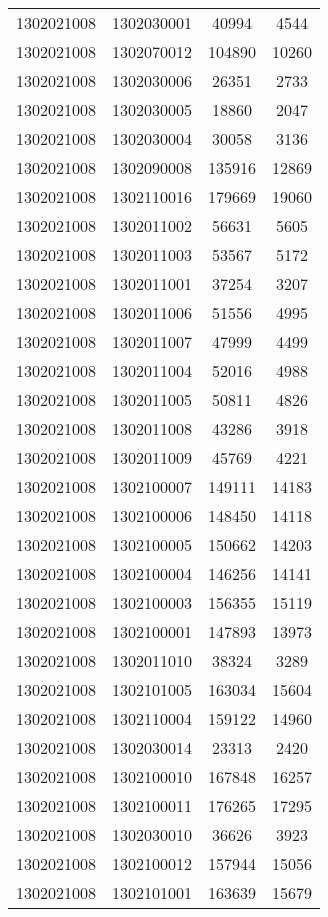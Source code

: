 \begin{longtable}[h]{llcc}
		1302021008 & 1302030001 & 40994 & 4544\\
		1302021008 & 1302070012 & 104890 & 10260\\
		1302021008 & 1302030006 & 26351 & 2733\\
		1302021008 & 1302030005 & 18860 & 2047\\
		1302021008 & 1302030004 & 30058 & 3136\\
		1302021008 & 1302090008 & 135916 & 12869\\
		1302021008 & 1302110016 & 179669 & 19060\\
		1302021008 & 1302011002 & 56631 & 5605\\
		1302021008 & 1302011003 & 53567 & 5172\\
		1302021008 & 1302011001 & 37254 & 3207\\
		1302021008 & 1302011006 & 51556 & 4995\\
		1302021008 & 1302011007 & 47999 & 4499\\
		1302021008 & 1302011004 & 52016 & 4988\\
		1302021008 & 1302011005 & 50811 & 4826\\
		1302021008 & 1302011008 & 43286 & 3918\\
		1302021008 & 1302011009 & 45769 & 4221\\
		1302021008 & 1302100007 & 149111 & 14183\\
		1302021008 & 1302100006 & 148450 & 14118\\
		1302021008 & 1302100005 & 150662 & 14203\\
		1302021008 & 1302100004 & 146256 & 14141\\
		1302021008 & 1302100003 & 156355 & 15119\\
		1302021008 & 1302100001 & 147893 & 13973\\
		1302021008 & 1302011010 & 38324 & 3289\\
		1302021008 & 1302101005 & 163034 & 15604\\
		1302021008 & 1302110004 & 159122 & 14960\\
		1302021008 & 1302030014 & 23313 & 2420\\
		1302021008 & 1302100010 & 167848 & 16257\\
		1302021008 & 1302100011 & 176265 & 17295\\
		1302021008 & 1302030010 & 36626 & 3923\\
		1302021008 & 1302100012 & 157944 & 15056\\
		1302021008 & 1302101001 & 163639 & 15679\\

\end{longtable}
